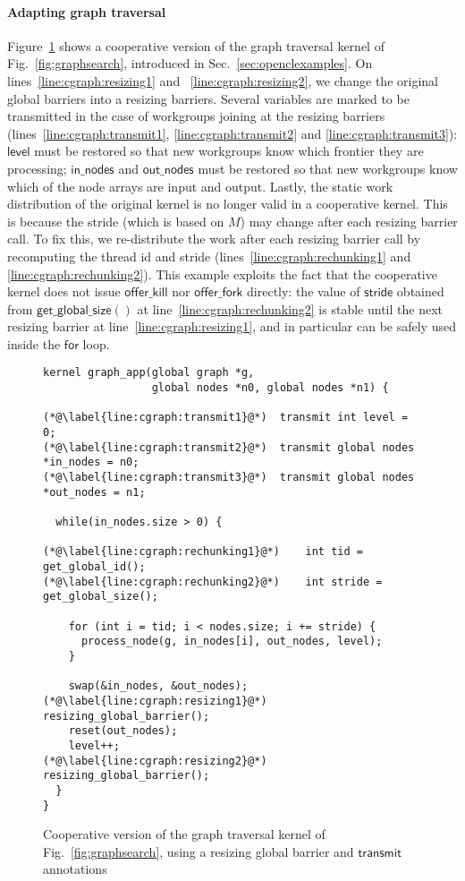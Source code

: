 \documentclass[numbers,nocopyrightspace,10pt]{sigplanconf}
\newcommand{\myfig}{Fig.~}
\newcommand{\myfiglong}{Figure~}
\newcommand{\mysec}{Sec.~}
\newcommand{\transmit}{\mathsf{transmit}}
\newcommand{\offerfork}{\mathsf{offer\_fork}}
\newcommand{\offerkill}{\mathsf{offer\_kill}}
\newcommand{\getglobalsize}{\mathsf{get\_global\_size}}
\newcommand{\keyword}[1]{\mathsf{#1}}
\begin{document}
\paragraph{Adapting graph traversal} 
\myfiglong\ref{fig:cgraphsearch} shows a cooperative version of the
graph traversal kernel of \myfig\ref{fig:graphsearch}, introduced in
\mysec\ref{sec:openclexamples}.  On lines~\ref{line:cgraph:resizing1}
and ~\ref{line:cgraph:resizing2}, we change the original global
barriers into a resizing barriers. Several variables are marked to be
transmitted in the case of workgroups joining at the resizing barriers
(lines~\ref{line:cgraph:transmit1}, \ref{line:cgraph:transmit2} and
\ref{line:cgraph:transmit3}): $\keyword{level}$ must be restored so
that new workgroups know which frontier they are processing;
$\keyword{in\_nodes}$ and $\keyword{out\_nodes}$ must be restored so
that new workgroups know which of the node arrays are input and
output. Lastly, the static work distribution of the original kernel is
no longer valid in a cooperative kernel. This is because the stride
(which is based on $M$) may change after each resizing barrier
call. To fix this, we re-distribute the work after each resizing
barrier call by recomputing the thread id and stride
(lines~\ref{line:cgraph:rechunking1} and
\ref{line:cgraph:rechunking2}). This example exploits the fact that
the cooperative kernel does not issue $\offerkill$ nor $\offerfork$
directly: the value of $\keyword{stride}$ obtained from
$\getglobalsize()$ at line~\ref{line:cgraph:rechunking2} is stable
until the next resizing barrier at line~\ref{line:cgraph:resizing1},
and in particular can be safely used inside the $\keyword{for}$ loop.

\begin{figure}

\begin{lstlisting}
kernel graph_app(global graph *g, 
                 global nodes *n0, global nodes *n1) {

(*@\label{line:cgraph:transmit1}@*)  transmit int level = 0;
(*@\label{line:cgraph:transmit2}@*)  transmit global nodes *in_nodes = n0;
(*@\label{line:cgraph:transmit3}@*)  transmit global nodes *out_nodes = n1;

  while(in_nodes.size > 0) {

(*@\label{line:cgraph:rechunking1}@*)    int tid = get_global_id();
(*@\label{line:cgraph:rechunking2}@*)    int stride = get_global_size();

    for (int i = tid; i < nodes.size; i += stride) {
      process_node(g, in_nodes[i], out_nodes, level);
    }

    swap(&in_nodes, &out_nodes);
(*@\label{line:cgraph:resizing1}@*)    resizing_global_barrier();
    reset(out_nodes);
    level++;
(*@\label{line:cgraph:resizing2}@*)    resizing_global_barrier();
  }
}
\end{lstlisting}
\caption{Cooperative version of the graph traversal kernel of \myfig\ref{fig:graphsearch}, using a resizing global barrier and $\transmit$ annotations}\label{fig:cgraphsearch}
\end{figure}
\end{document}
